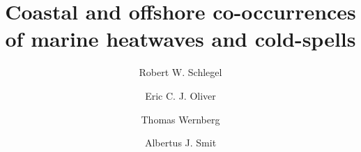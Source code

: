 \documentclass[a4paper,10pt,review]{elsarticle}
\begin{document}
\begin{frontmatter}

\title{Coastal and offshore co-occurrences of marine heatwaves and cold-spells}

\author[firstaddress]{Robert W. Schlegel}
\author[secondaddress,thirdaddress]{Eric C. J. Oliver}
\author[fourthaddress]{Thomas Wernberg}
\author[firstaddress]{Albertus J. Smit}


\address[firstaddress]{Department of Biodiversity and Conservation Biology, University of the Western Cape, Private Bag X17, Bellville 7535, South Africa}

\address[secondaddress]{ARC Centre of Excellence for Climate System Science, Australia}

\address[thirdaddress]{Institute for Marine and Antarctic Studies, University of Tasmania, Hobart, Australia}

\address[fourthaddress]{UWA Oceans Institute and School of Plant Biology, The University of Western Australia, Crawley, 6009 Western Australia, Australia}


\end{frontmatter}
\end{document}
